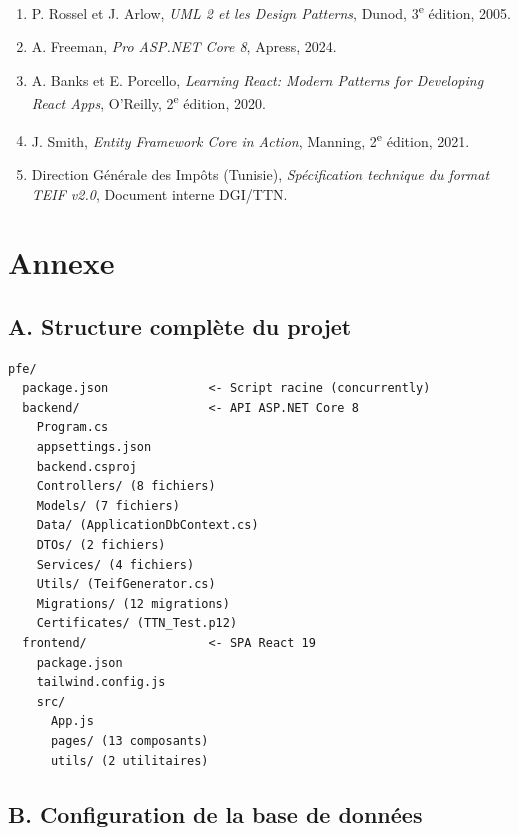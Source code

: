 \documentclass[a4paper,12pt]{report}
\begin{document}
\begin{enumerate}[nosep]
    \item P. Rossel et J. Arlow, \textit{UML 2 et les Design Patterns}, Dunod, 3\textsuperscript{e} édition, 2005.
    \item A. Freeman, \textit{Pro ASP.NET Core 8}, Apress, 2024.
    \item A. Banks et E. Porcello, \textit{Learning React: Modern Patterns for Developing React Apps}, O'Reilly, 2\textsuperscript{e} édition, 2020.
    \item J. Smith, \textit{Entity Framework Core in Action}, Manning, 2\textsuperscript{e} édition, 2021.
    \item Direction Générale des Impôts (Tunisie), \textit{Spécification technique du format TEIF v2.0}, Document interne DGI/TTN.
\end{enumerate}


\chapter*{Annexe}

\section*{A. Structure complète du projet}

\begin{lstlisting}[language={}, caption={Arborescence du projet El Fatoora}]
pfe/
  package.json              <- Script racine (concurrently)
  backend/                  <- API ASP.NET Core 8
    Program.cs
    appsettings.json
    backend.csproj
    Controllers/ (8 fichiers)
    Models/ (7 fichiers)
    Data/ (ApplicationDbContext.cs)
    DTOs/ (2 fichiers)
    Services/ (4 fichiers)
    Utils/ (TeifGenerator.cs)
    Migrations/ (12 migrations)
    Certificates/ (TTN_Test.p12)
  frontend/                 <- SPA React 19
    package.json
    tailwind.config.js
    src/
      App.js
      pages/ (13 composants)
      utils/ (2 utilitaires)
\end{lstlisting}

\section*{B. Configuration de la base de données}
\end{document}
